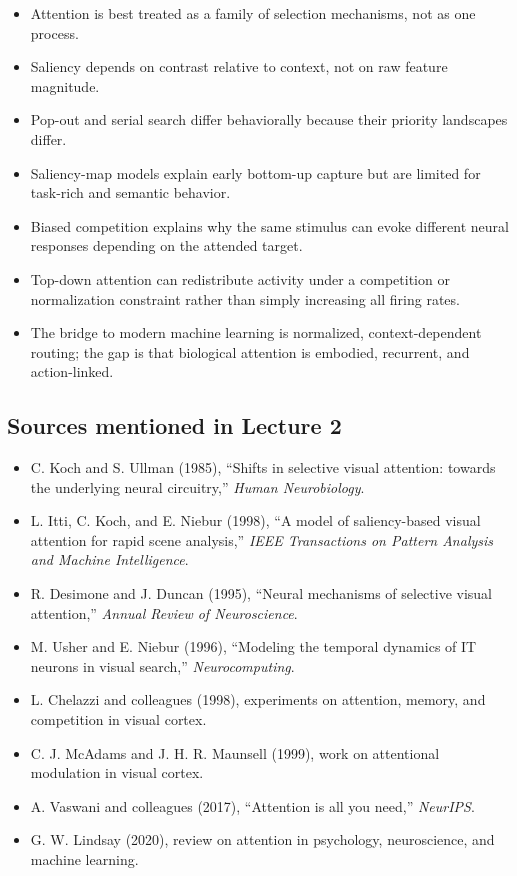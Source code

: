 \begin{itemize}
    \item Attention is best treated as a family of selection mechanisms, not as one process.
    \item Saliency depends on contrast relative to context, not on raw feature magnitude.
    \item Pop-out and serial search differ behaviorally because their priority landscapes differ.
    \item Saliency-map models explain early bottom-up capture but are limited for task-rich and semantic behavior.
    \item Biased competition explains why the same stimulus can evoke different neural responses depending on the attended target.
    \item Top-down attention can redistribute activity under a competition or normalization constraint rather than simply increasing all firing rates.
    \item The bridge to modern machine learning is normalized, context-dependent routing; the gap is that biological attention is embodied, recurrent, and action-linked.
\end{itemize}

\subsection*{Sources mentioned in Lecture 2}

\begin{itemize}
    \item C. Koch and S. Ullman (1985), ``Shifts in selective visual attention: towards the underlying neural circuitry,'' \emph{Human Neurobiology}.
    \item L. Itti, C. Koch, and E. Niebur (1998), ``A model of saliency-based visual attention for rapid scene analysis,'' \emph{IEEE Transactions on Pattern Analysis and Machine Intelligence}.
    \item R. Desimone and J. Duncan (1995), ``Neural mechanisms of selective visual attention,'' \emph{Annual Review of Neuroscience}.
    \item M. Usher and E. Niebur (1996), ``Modeling the temporal dynamics of IT neurons in visual search,'' \emph{Neurocomputing}.
    \item L. Chelazzi and colleagues (1998), experiments on attention, memory, and competition in visual cortex.
    \item C. J. McAdams and J. H. R. Maunsell (1999), work on attentional modulation in visual cortex.
    \item A. Vaswani and colleagues (2017), ``Attention is all you need,'' \emph{NeurIPS}.
    \item G. W. Lindsay (2020), review on attention in psychology, neuroscience, and machine learning.
\end{itemize}
